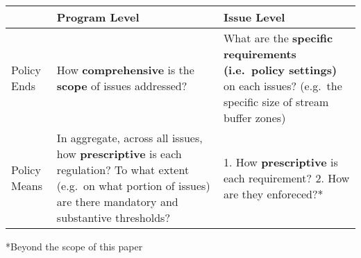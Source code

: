 \begin{table}
\caption{Concepts and measures of regulatory stringency}
\label{measures}

\begin{longtable}[]{@{}lll@{}}
\toprule
\begin{minipage}[b]{0.09\columnwidth}\raggedright\strut
\strut
\end{minipage} & \begin{minipage}[b]{0.41\columnwidth}\raggedright\strut
Program Level\strut
\end{minipage} & \begin{minipage}[b]{0.41\columnwidth}\raggedright\strut
Issue Level\strut
\end{minipage}\tabularnewline
\midrule
\endhead
\begin{minipage}[t]{0.09\columnwidth}\raggedright\strut
Policy Ends\strut
\end{minipage} & \begin{minipage}[t]{0.41\columnwidth}\raggedright\strut
How \textbf{comprehensive} is the \textbf{scope} of issues
addressed?\strut
\end{minipage} & \begin{minipage}[t]{0.41\columnwidth}\raggedright\strut
What are the \textbf{specific requirements (i.e.~policy settings)} on
each issues? (e.g.~the specific size of stream buffer zones)\strut
\end{minipage}\tabularnewline
\begin{minipage}[t]{0.09\columnwidth}\raggedright\strut
Policy Means\strut
\end{minipage} & \begin{minipage}[t]{0.41\columnwidth}\raggedright\strut
In aggregate, across all issues, how \textbf{prescriptive} is each
regulation? To what extent (e.g.~on what portion of issues) are there
mandatory and substantive thresholds?\strut
\end{minipage} & \begin{minipage}[t]{0.41\columnwidth}\raggedright\strut
1. How \textbf{prescriptive} is each requirement? 2. How are they
enforeced?*\strut
\end{minipage}\tabularnewline
\bottomrule
\end{longtable}

\end{table}

*Beyond the scope of this paper